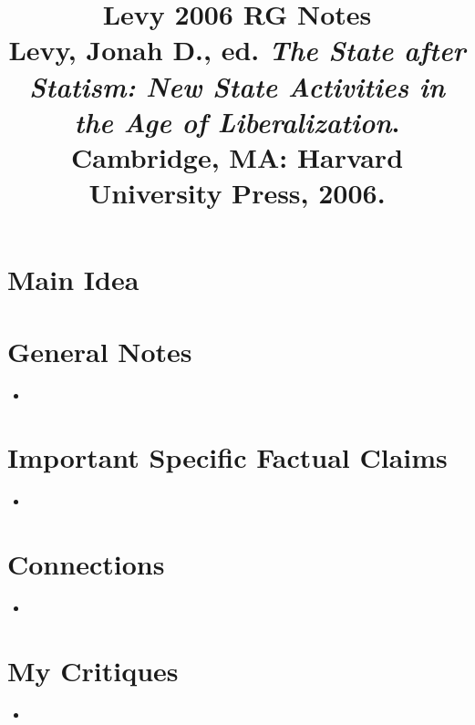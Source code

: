 \documentclass[12pt]{article}
\title{\textbf{Levy 2006 RG Notes}\\
\large Levy, Jonah D., ed. \textit{The State after Statism: New State Activities in the Age of Liberalization}.\\
Cambridge, MA: Harvard University Press, 2006.}
\author{}
\date{}
\begin{document}
\maketitle

\section{Main Idea}



\section{General Notes}

\begin{itemize}[leftmargin=*, itemsep=4pt]
    \item
\end{itemize}


\section{Important Specific Factual Claims}

\begin{itemize}[leftmargin=*, itemsep=4pt]
    \item
\end{itemize}


\section{Connections}

\begin{itemize}[leftmargin=*, itemsep=4pt]
    \item
\end{itemize}


\section{My Critiques}

\begin{itemize}[leftmargin=*, itemsep=4pt]
    \item
\end{itemize}
\end{document}
